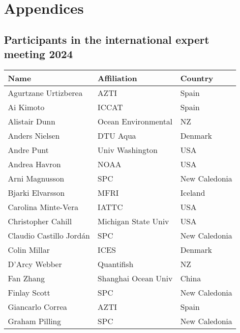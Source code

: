 \documentclass{SCreport}
\newcommand\I[1]{\rule{0pt}{#1}}
\begin{document}
\newpage

\appendix

\section{Appendices}

\subsection{Participants in the international expert meeting 2024}
\label{sec:meeting-participants}

\vspace{2ex}

\begin{tabular}{lll}
  \hline
  Name                    & Affiliation          & Country\\
  \hline
  Agurtzane Urtizberea    & AZTI                 & Spain\I{2.8ex}\\
  Ai Kimoto               & ICCAT                & Spain\\
  Alistair Dunn           & Ocean Environmental  & NZ\\
  Anders Nielsen          & DTU Aqua             & Denmark\\
  Andre Punt              & Univ Washington      & USA\\
  Andrea Havron           & NOAA                 & USA\\
  Arni Magnusson          & SPC                  & New Caledonia\\
  Bjarki Elvarsson        & MFRI                 & Iceland\\
  Carolina Minte-Vera     & IATTC                & USA\\
  Christopher Cahill      & Michigan State Univ  & USA\\
  Claudio Castillo Jordán & SPC                  & New Caledonia\\
  Colin Millar            & ICES                 & Denmark\\
  D'Arcy Webber           & Quantifish           & NZ\\
  Fan Zhang               & Shanghai Ocean Univ  & China\\
  Finlay Scott            & SPC                  & New Caledonia\\
  Giancarlo Correa        & AZTI                 & Spain\\
  Graham Pilling          & SPC                  & New Caledonia\\

\end{tabular}
\end{document}
